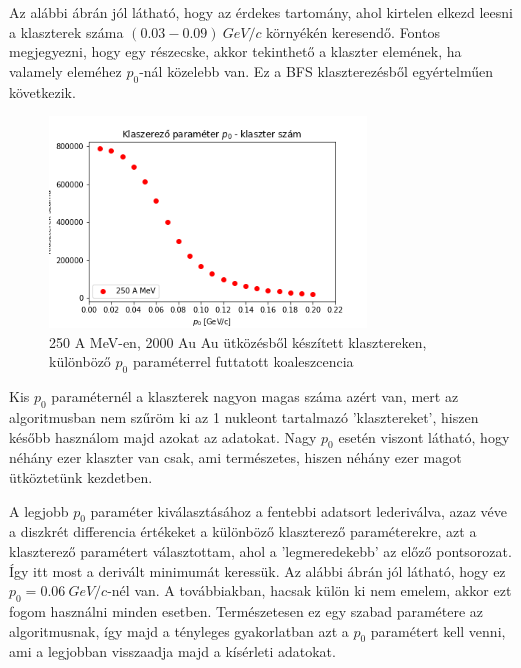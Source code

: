 \documentclass[a4paper,12pt]{article}
\begin{document}
\par Az alábbi ábrán jól látható, hogy az érdekes tartomány, ahol kirtelen elkezd leesni a klaszterek száma $(0.03 - 0.09) ~GeV/c$ környékén keresendő. Fontos megjegyezni, hogy egy részecske, akkor tekinthető a klaszter elemének, ha valamely eleméhez $p_{0}$-nál közelebb van. Ez a BFS klaszterezésből egyértelműen következik. 

\vspace{5mm}

\begin{figure}[!htb]
\centering
\includegraphics[width=0.75\textwidth]{./klaszterszamparameter.png}
\caption{250 A MeV-en, 2000 Au Au ütközésből készített klasztereken, különböző $p_{0}$ paraméterrel futtatott koaleszcencia}
\end{figure}

\vspace{5mm}

\par Kis $p_{0}$ paraméternél a klaszterek nagyon magas száma azért van, mert az algoritmusban nem szűröm ki az 1 nukleont tartalmazó 'klasztereket', hiszen később használom majd azokat az adatokat. Nagy $p_{0}$ esetén viszont látható, hogy néhány ezer klaszter van csak, ami természetes, hiszen néhány ezer magot ütköztetünk kezdetben.

\vspace{5mm}

\par A legjobb $p_{0}$ paraméter kiválasztásához a fentebbi adatsort lederiválva, azaz véve a diszkrét differencia értékeket a különböző klaszterező paraméterekre, azt a klaszterező paramétert választottam, ahol a 'legmeredekebb' az előző pontsorozat. Így itt most a derivált minimumát keressük. Az alábbi ábrán jól látható, hogy ez $p_{0} = 0.06 ~GeV/c$-nél van. A továbbiakban, hacsak külön ki nem emelem, akkor ezt fogom használni minden esetben. Természetesen ez egy szabad paramétere az algoritmusnak, így majd a tényleges gyakorlatban azt a $p_{0}$ paramétert kell venni, ami a legjobban visszaadja majd a kísérleti adatokat.
\end{document}
